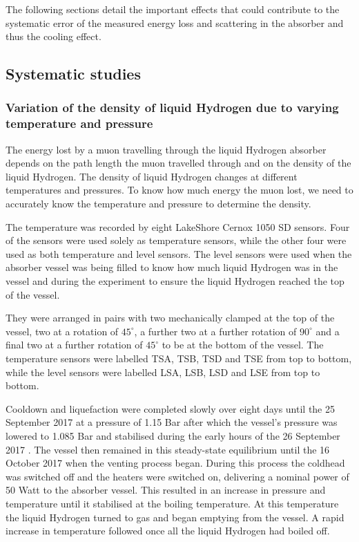 The following sections detail the important effects that could contribute to the systematic error of the measured energy loss and scattering in the absorber and thus the cooling effect.

\subsection{Systematic studies}

\subsubsection{Variation of the density of liquid Hydrogen due to varying temperature and pressure}
\label{SubSect:Absorber_temperature}

 The energy lost by a muon travelling through the liquid Hydrogen absorber depends on the path length the
 muon travelled through and on the density of the liquid Hydrogen. The density of liquid Hydrogen changes
 at different temperatures and pressures. To know how much energy the muon lost, we need to accurately know
 the temperature and pressure to determine the density. 
 
 The temperature was recorded by eight LakeShore Cernox 1050 SD sensors. Four of the sensors
 were used solely as temperature sensors, while the other four were used as both temperature and level
 sensors. The level sensors were used when the absorber vessel was being filled to know how much liquid
 Hydrogen was in the vessel and during the experiment to ensure the liquid Hydrogen reached the top of the
 vessel. 

 They were arranged in pairs
 with two mechanically clamped at the
 top of the vessel, two at a rotation of ${45}^{\circ}$, a further two at a further rotation of
 ${90}^{\circ}$ and a final two at a further rotation of ${45}^{\circ}$ to be at the bottom of the vessel.
 The temperature sensors were labelled TSA, TSB, TSD and TSE from top to bottom, while the level sensors
 were labelled LSA, LSB, LSD and LSE from top to bottom.

Cooldown and liquefaction were completed slowly over eight days until the 25 September 2017 at a pressure of 1.15 Bar after which the vessel's pressure was lowered to 1.085 Bar and stabilised during the early hours of the 26 September 2017 \cite{1748-0221-13-09-T09008}. The vessel then remained in this steady-state equilibrium until the 16 October 2017 when the venting process began. During this process the coldhead was switched off and the heaters were switched on, delivering a nominal power of 50 Watt to the absorber vessel. This resulted in an increase in pressure and temperature until it stabilised at the boiling temperature. At this temperature the liquid Hydrogen turned to gas and began emptying from the vessel. A rapid increase in temperature followed once all the liquid Hydrogen had boiled off.

